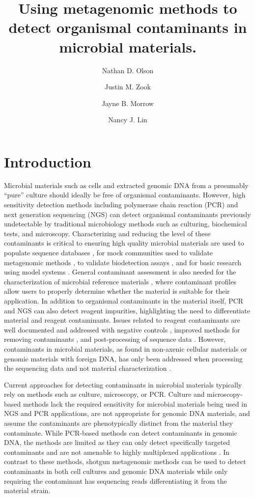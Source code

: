 \documentclass[fleqn,10pt,lineno]{wlpeerj}\usepackage[]{graphicx}\usepackage[]{color}
\title{Using metagenomic methods to detect organismal contaminants in microbial materials.}
\author[1]{Nathan D. Olson}
\author[1]{Justin M. Zook}
\author[1]{Jayne B. Morrow}
\author[1]{Nancy J. Lin}
\affil[1]{Material Measurement Laboratory, National Institute of Standards and Technology}
\begin{document}
\flushbottom
\maketitle
\thispagestyle{empty}

\section*{Introduction} 
Microbial materials such as cells and extracted genomic DNA from a presumably “pure” culture should ideally be free of organismal contaminants. 
However, high sensitivity detection methods including polymerase chain reaction (PCR) and next generation sequencing (NGS) can detect organismal contaminants previously undetectable by traditional microbiology methods such as culturing, biochemical tests, and microscopy. 
Characterizing and reducing the level of these contaminants is critical to ensuring high quality microbial materials are used to populate sequence databases \citep{parks2015checkm}, for mock communities used to validate metagenomic methods \citep{bokulich2016mockrobiota}, to validate biodetection assays  \citep{Ieven2013,International2011}, and for basic research using model systems \citep{Shrestha2013}. 
General contaminant assessment is also needed for the characterization of microbial reference materials \citep{olson2016pepr}, where contaminant profiles allow users to properly determine whether the material is suitable for their application. 
In addition to organismal contaminants in the material itself, PCR and NGS can also detect reagent impurities, highlighting the need to differentiate material and reagent contaminants. 
Issues related to reagent contaminants are well documented and addressed with negative controls \citep{jervis2015deriving}, improved methods for removing contaminants \citep{woyke2011decontamination,motley2014improved}, and post-processing of sequence data \citep{mukherjee2015large}. 
However, contaminants in microbial materials, as found in non-axenic cellular materials or genomic materials with foreign DNA, has only been addressed when processing the sequencing data and not material characterization \citep{Shrestha2013,tennessen2015prodege}.

Current approaches for detecting contaminants in microbial materials typically rely on methods such as culture, microscopy, or PCR. 
Culture and microscopy-based methods lack the required sensitivity for microbial materials being used in NGS and PCR applications, are not appropriate for genomic DNA materials, and assume the contaminants are phenotypically distinct from the material they contaminate. 
While PCR-based methods can detect contaminants in genomic DNA, the methods are limited as they can only detect specifically targeted contaminants and are not amenable to highly multiplexed applications \citep{heck2016evaluating,Marron2013}. 
In contrast to these methods, shotgun metagenomic methods can be used to detect contaminants in both cell cultures and genomic DNA materials while only requiring the contaminant has sequencing reads differentiating it from the material strain.
\end{document}
